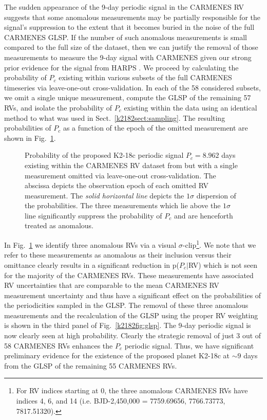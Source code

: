 The sudden appearance of the 9-day periodic signal in the CARMENES RV suggests that some anomalous 
measurements may be partially responsible for the signal's suppression
to the extent that it becomes buried in the noise of the full CARMENES GLSP. If the number of such
anomalous measurements is small compared to the full size of the dataset, then we can justify the removal of those
measurements to measure the 9-day signal with CARMENES given our strong prior evidence for the signal from HARPS
.
We proceed by calculating the probability of $P_c$ existing within various subsets of the full CARMENES timeseries
via leave-one-out cross-validation.
In each of the 58 considered subsets, we omit a single unique measurement, compute the
GLSP of the remaining 57 RVs, and isolate the probability of $P_c$ existing within the data using an identical method
to what was used in Sect.~\ref{k2182sect:sampling}. The resulting probabilities of $P_c$ as a function of the epoch of the
omitted measurement are shown in Fig.~\ref{k2182fig:prob9}. 

\begin{figure}
  \centering
  \caption[Leave-one-out cross-validation on the CARMENES RV timeseries.]
    {\small Probability of the proposed K2-18c periodic signal $P_c=8.962$ days existing within the
    CARMENES RV dataset from  but with a single measurement omitted via leave-one-out
    cross-validation. The abscissa depicts
    the observation epoch of each omitted RV measurement. The \emph{solid horizontal line} depicts the $1\sigma$
    dispersion of the probabilities. The three measurements which lie above the $1\sigma$ line significantly
    suppress the probability of $P_c$ and are henceforth treated as anomalous.}
  \label{k2182fig:prob9}
\end{figure}

In Fig.~\ref{k2182fig:prob9}
we identify three anomalous RVs via a visual $\sigma$-clip\footnote{For RV indices starting at 0, the three anomalous
  CARMENES RVs have indices 4, 6, and 14 (i.e. BJD-2,450,000 = 7759.69656, 7766.73773, 7817.51320).}.
We note that we refer to these measurements as anomalous as their inclusion
versus their omittance clearly results in a significant reduction in p($P_c|$RV) which is not seen for the majority of
the CARMENES RVs. These measurements have associated RV uncertainties that are
comparable to the mean CARMENES RV measurement uncertainty and thus have a significant effect on the probabilities
of the periodicities sampled in the GLSP. The removal of these three anomalous measurements and the
recalculation of the GLSP using the proper RV weighting is shown in the third panel of Fig.~\ref{k2182fig:glsp}.
The 9-day periodic signal is now clearly seen at high probability. Clearly the strategic removal of just
3 out of 58 CARMENES RVs enhances the $P_c$ periodic signal. Thus, we have significant preliminary evidence for the
existence of the proposed planet K2-18c at $\sim 9$ days from the GLSP of the remaining 55 CARMENES RVs.

